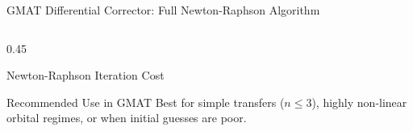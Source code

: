 \documentclass[aspectratio=169, 10pt]{beamer}
\begin{document}
\begin{frame}{GMAT Differential Corrector: Full Newton-Raphson Algorithm}
\begin{columns}[t]
\begin{column}{0.45\textwidth}
\begin{block}{Newton-Raphson Iteration Cost}
            \end{block}

            \vspace{-0.1cm}

            \begin{exampleblock}{Recommended Use in GMAT}
                \scriptsize
                Best for simple transfers ($n \le 3$), highly non-linear orbital regimes, or when initial guesses are poor.
            \end{exampleblock}
        \end{column}
    \end{columns}
\end{frame}
\end{document}
